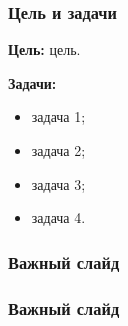 \documentclass{bmstu-pr}
\begin{document}

\begin{frame}
    \frametitle{Цель и задачи}

    \textbf{Цель:} цель.

    \textbf{Задачи:}
    \begin{itemize}
        \item задача 1;
        \item задача 2;
        \item задача 3;
        \item задача 4.
    \end{itemize}
\end{frame}

\begin{frame}
    \frametitle{Важный слайд}

\end{frame}

\begin{frame}
    \frametitle{Важный слайд}



\end{frame}
\end{document}
